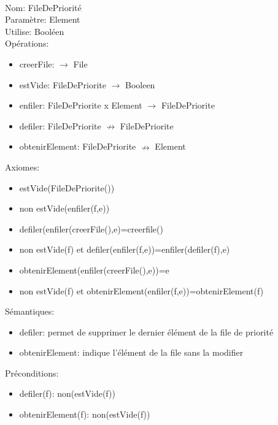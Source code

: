 \documentclass{article}
\begin{document}
    \noindent
    \thispagestyle{empty} \\
    Nom: FileDePriorité \\
    Paramètre: Element \\
    Utilise: Booléen \\
    Opérations: \begin{itemize}[label=$\ $, leftmargin=2cm]
        \item creerFile: $\rightarrow$ File
        \item estVide: FileDePriorite $\rightarrow$ Booleen
        \item enfiler: FileDePriorite x Element $\rightarrow$ FileDePriorite
        \item defiler: FileDePriorite $\nrightarrow$ FileDePriorite
        \item obtenirElement: FileDePriorite $\nrightarrow$ Element
    \end{itemize}
    Axiomes: \begin{itemize}[label=$\- $, leftmargin=2cm]
        \item estVide(FileDePriorite())
        \item non estVide(enfiler(f,e))
        \item defiler(enfiler(creerFile(),e)=creerfile()
        \item non estVide(f) et defiler(enfiler(f,e))=enfiler(defiler(f),e)
        \item obtenirElement(enfiler(creerFile(),e))=e
        \item non estVide(f) et obtenirElement(enfiler(f,e))=obtenirElement(f)
    \end{itemize}
    Sémantiques: \begin{itemize}[label=$\-$, leftmargin=2cm]
        \item defiler: permet de supprimer le dernier élément de la file de priorité
        \item obtenirElement: indique l'élément de la file sans la modifier
    \end{itemize}
    Préconditions: \begin{itemize}[label=$\- $, leftmargin=2cm]
        \item defiler(f): non(estVide(f))
        \item obtenirElement(f): non(estVide(f))
    \end{itemize}
\end{document}
